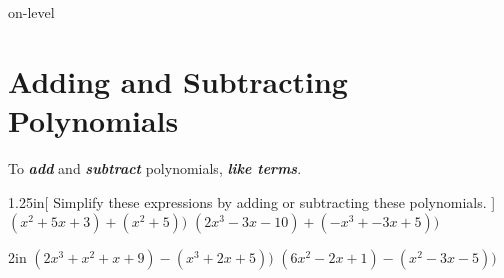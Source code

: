 \begin{taggedblock}{on-level}

\section{Adding and Subtracting Polynomials}

\vspace{-0.5em}
\begin{myCenteredBox}[width=5.5in,colback=white,]
    To {\bfseries\itshape add} and {\bfseries\itshape subtract} polynomials,
     {\bfseries\itshape like terms}.
\end{myCenteredBox}

\vspace{-1em}
\begin{my2Problems}[\large]{1.25in}[
    Simplify these expressions by adding or subtracting these polynomials.
    ]
    {
        $ (x^2 + 5x + 3) + (x^2  + 5)) $
    }
    {
        $ (2x^3 - 3x -10) + (-x^3 + -3x + 5)) $
    }
\end{my2Problems}
\begin{my2Problems}[\large]{2in}
    {
        $ (2x^3 + x^2 + x + 9) - (x^3 + 2x + 5)) $
    }
    {
        $ (6x^2 - 2x + 1) - (x^2 - 3x - 5)) $
    }
\end{my2Problems}


\end{taggedblock}